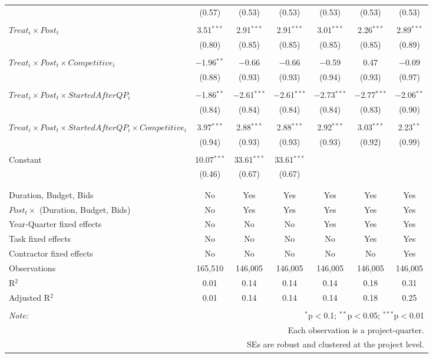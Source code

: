 \documentclass[
]{article}
\begin{document}
\begin{table}[H]
\begin{tabular}{@{\extracolsep{-3pt}}lcccccc}
  & (0.57) & (0.53) & (0.53) & (0.53) & (0.53) & (0.53) \\ 
  & & & & & & \\ 
 $Treat_i \times Post_t$ & 3.51$^{***}$ & 2.91$^{***}$ & 2.91$^{***}$ & 3.01$^{***}$ & 2.26$^{***}$ & 2.89$^{***}$ \\ 
  & (0.80) & (0.85) & (0.85) & (0.85) & (0.85) & (0.89) \\ 
  & & & & & & \\ 
 $Treat_i \times Post_t \times Competitive_i$ & $-$1.96$^{**}$ & $-$0.66 & $-$0.66 & $-$0.59 & 0.47 & $-$0.09 \\ 
  & (0.88) & (0.93) & (0.93) & (0.94) & (0.93) & (0.97) \\ 
  & & & & & & \\ 
 $Treat_i \times Post_t \times StartedAfterQP_i$ & $-$1.86$^{**}$ & $-$2.61$^{***}$ & $-$2.61$^{***}$ & $-$2.73$^{***}$ & $-$2.77$^{***}$ & $-$2.06$^{**}$ \\ 
  & (0.84) & (0.84) & (0.84) & (0.84) & (0.83) & (0.90) \\ 
  & & & & & & \\ 
 $Treat_i \times Post_t \times StartedAfterQP_i \times Competitive_i$ & 3.97$^{***}$ & 2.88$^{***}$ & 2.88$^{***}$ & 2.92$^{***}$ & 3.03$^{***}$ & 2.23$^{**}$ \\ 
  & (0.94) & (0.93) & (0.93) & (0.93) & (0.92) & (0.99) \\ 
  & & & & & & \\ 
 Constant & 10.07$^{***}$ & 33.61$^{***}$ & 33.61$^{***}$ &  &  &  \\ 
  & (0.46) & (0.67) & (0.67) &  &  &  \\ 
  & & & & & & \\ 
\hline \\[-1.8ex] 
Duration, Budget, Bids & No & Yes & Yes & Yes & Yes & Yes \\ 
$Post_t \times $  (Duration, Budget, Bids) & No & Yes & Yes & Yes & Yes & Yes \\ 
Year-Quarter fixed effects & No & No & No & Yes & Yes & Yes \\ 
Task fixed effects & No & No & No & No & Yes & Yes \\ 
Contractor fixed effects & No & No & No & No & No & Yes \\ 
Observations & 165,510 & 146,005 & 146,005 & 146,005 & 146,005 & 146,005 \\ 
R$^{2}$ & 0.01 & 0.14 & 0.14 & 0.14 & 0.18 & 0.31 \\ 
Adjusted R$^{2}$ & 0.01 & 0.14 & 0.14 & 0.14 & 0.18 & 0.25 \\ 
\hline 
\hline \\[-1.8ex] 
\textit{Note:}  & \multicolumn{6}{r}{$^{*}$p$<$0.1; $^{**}$p$<$0.05; $^{***}$p$<$0.01} \\ 
 & \multicolumn{6}{r}{Each observation is a project-quarter.} \\ 
 & \multicolumn{6}{r}{SEs are robust and clustered at the project level.} \\ 
\end{tabular} 
\end{table}
\end{document}
